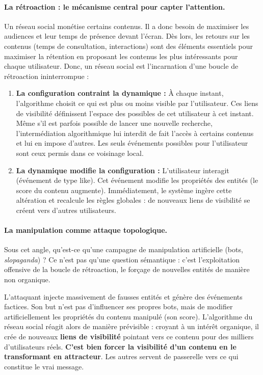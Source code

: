 \documentclass{report}
\begin{document}
	\paragraph{La rétroaction : le mécanisme central pour capter l'attention.} Un réseau social monétise certains contenus. Il a donc besoin de maximiser les audiences et leur temps de présence devant l'écran. Dès lors, les retours sur les contenus (temps de consultation, interactions) sont des éléments essentiels pour maximiser la rétention en proposant les contenus les plus intéressants pour chaque utilisateur. Donc, un réseau social est l'incarnation d'une boucle de rétroaction ininterrompue :
	\begin{enumerate}
		\item \textbf{La configuration contraint la dynamique :} À chaque instant, l'algorithme choisit ce qui est plus ou moins visible par l'utilisateur. Ces liens de visibilité définissent l'espace des possibles de cet utilisateur à cet instant. Même s'il est parfois possible de lancer une nouvelle recherche, l'intermédiation algorithmique lui interdit de fait l'accès à certains contenus et lui en impose d'autres. Les seuls événements possibles pour l'utilisateur sont ceux permis dans ce voisinage local.
		\item \textbf{La dynamique modifie la configuration :} L'utilisateur interagit (événement de type \og{}like\fg{}). Cet événement modifie les propriétés des entités (le score du contenu augmente). Immédiatement, le système ingère cette altération et recalcule les règles globales : de nouveaux liens de visibilité se créent vers d'autres utilisateurs.
	\end{enumerate}
	
	\paragraph{La manipulation comme attaque topologique.} 
	Sous cet angle, qu'est-ce qu'une campagne de manipulation artificielle (bots, \textit{slopaganda}) ? Ce n'est pas qu'une question sémantique : c'est l'exploitation offensive de la boucle de rétroaction, le forçage de nouvelles entités de manière non organique. 
	
	L'attaquant injecte massivement de fausses entités et génère des événements factices. Son but n'est pas d'influencer ses propres bots, mais de modifier artificiellement les propriétés du contenu manipulé (son score). L'algorithme du réseau social réagit alors de manière prévisible : croyant à un intérêt organique, il crée de nouveaux \textbf{liens de visibilité} pointant vers ce contenu pour des milliers d'utilisateurs réels. \textbf{C'est bien forcer la visibilité d'un contenu en le transformant en attracteur}. Les autres servent de passerelle vers ce qui constitue le vrai message. 
	
\end{document}

